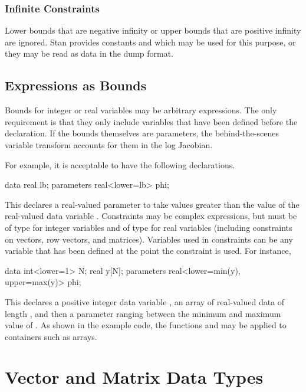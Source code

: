 \subsubsection{Infinite Constraints}

Lower bounds that are negative infinity or upper bounds that are
positive infinity are ignored.  Stan provides constants
 and  which may
be used for this purpose, or they may be read as data in the dump
format.


\subsection{Expressions as Bounds}

Bounds for integer or real variables may be arbitrary expressions.
The only requirement is that they only include variables that have
been defined before the declaration.  If the bounds themselves are
parameters, the behind-the-scenes variable transform accounts for them
in the log Jacobian.

For example, it is acceptable to have the
following declarations.
%
\begin{stancode}
data {
 real lb;
}
parameters {
   real<lower=lb> phi;
}
\end{stancode}
%
This declares a real-valued parameter  to take values
greater than the value of the real-valued data variable .
Constraints may be complex expressions, but must be of type 
for integer variables and of type  for real variables
(including constraints on vectors, row vectors, and matrices).
Variables used in constraints can be any variable that has been
defined at the point the constraint is used.  For instance,
\begin{stancode}
data {
   int<lower=1> N;
   real y[N];
}
parameters {
   real<lower=min(y), upper=max(y)> phi;
}
\end{stancode}
%
This declares a positive integer data variable , an array
 of real-valued data of length , and then a parameter
ranging between the minimum and maximum value of .  As shown
in the example code, the functions  and  may
be applied to containers such as arrays.

\section{Vector and Matrix Data Types}

